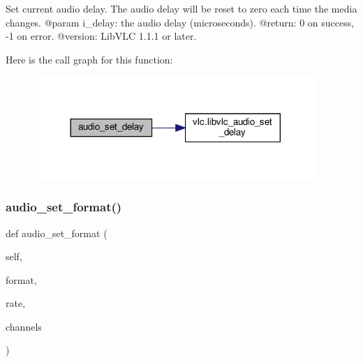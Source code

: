 \begin{DoxyVerb}Set current audio delay. The audio delay will be reset to zero each time the media changes.
@param i_delay: the audio delay (microseconds).
@return: 0 on success, -1 on error.
@version: LibVLC 1.1.1 or later.
\end{DoxyVerb}
 Here is the call graph for this function\+:
\nopagebreak
\begin{figure}[H]
\begin{center}
\leavevmode
\includegraphics[width=305pt]{classvlc_1_1_media_player_a0f4fdb7a7b7fa38629ee2f9930ed0967_cgraph}
\end{center}
\end{figure}
\mbox{\label{classvlc_1_1_media_player_adc106c83f7c6be94fcd6dcbe6242f72e}} 
\subsubsection{\texorpdfstring{audio\+\_\+set\+\_\+format()}{audio\_set\_format()}}
{\footnotesize\ttfamily def audio\+\_\+set\+\_\+format (\begin{DoxyParamCaption}\item[{}]{self,  }\item[{}]{format,  }\item[{}]{rate,  }\item[{}]{channels }\end{DoxyParamCaption})}


